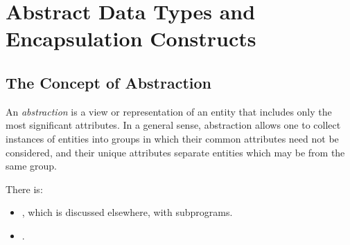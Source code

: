 \section{Abstract Data Types and Encapsulation Constructs}\label{sec:Abstract_Data_Types_Encapsulation_Constructs}
\subsection{The Concept of Abstraction}\label{subsec:Concept_Abstraction}
\begin{definition}[Abstraction]\label{def:Abstraction}
  An \emph{abstraction} is a view or representation of an entity that includes only the most significant attributes.
  In a general sense, abstraction allows one to collect instances of entities into groups in which their common attributes need not be considered, and their unique attributes separate entities which may be from the same group.

  There is:
  \begin{itemize}[noitemsep]
  \item {}, which is discussed elsewhere, with subprograms.
  \item {}.
  \end{itemize}
\end{definition}











